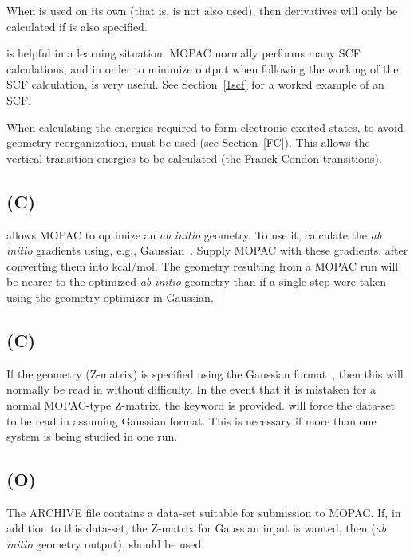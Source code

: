 When  is used on its own (that is,   is  not  also
used), then derivatives will only be calculated if  is also
specified.

 is helpful in a learning situation.   MOPAC  normally  performs
many SCF calculations, and in order to minimize output when following the
working of the SCF calculation,  is very useful. See
Section~\ref{1scf}  for a worked example of an SCF.

When calculating the energies required to form electronic excited states,  to
avoid geometry reorganization,  must be used (see Section~\ref{FC}).
This allows the vertical transition energies to be calculated (the
Franck-Condon transitions).

\subsection*{ (C)}
 allows MOPAC to optimize an {\em ab initio} geometry.   To  use
it, calculate  the  {\em ab initio}  gradients using, e.g.,
Gaussian~\cite{gaussian-92}. Supply MOPAC with these gradients, after
converting them into kcal/mol.  The  geometry resulting  from  a  MOPAC  run
will be nearer to the optimized {\em ab initio} geometry than if a single step
were taken using the geometry optimizer in  Gaussian.

 \subsection*{ (C)}
If the geometry (Z-matrix) is specified using the Gaussian
format~\cite{gaussian-92},  then this  will normally be read in without
difficulty.  In the event that it is mistaken for a  normal  MOPAC-type
Z-matrix,  the  keyword    is provided.  will force the
data-set to be read in assuming Gaussian format.  This is necessary if more
than one system is  being  studied  in one run.

\subsection*{ (O)}
The ARCHIVE file contains a  data-set  suitable  for  submission  to
MOPAC.  If, in addition to this data-set, the Z-matrix for Gaussian input
is wanted, then  ({\em ab initio} geometry output), should be used.

